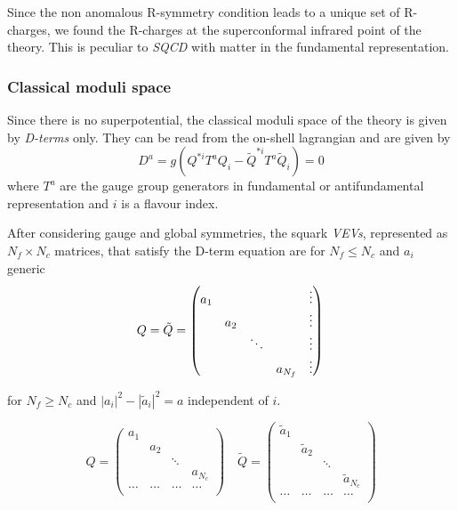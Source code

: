 Since the non anomalous R-symmetry condition leads to a unique set of R-charges, we found the R-charges at the superconformal infrared point of the theory.
This is peculiar to \emph{SQCD} with matter in the fundamental representation. 


\subsubsection{Classical moduli space}
Since there is no superpotential, the classical moduli space of the theory is given by \emph{D-terms} only. 
They can be read from the on-shell lagrangian and are given by
\begin{equation}
 D^a = g \left( Q^{*i} T^a Q_i - \tilde{Q}^{* i} T^a \tilde{Q}_i \right) = 0
\end{equation}
where $T^a$ are the gauge group generators in fundamental or antifundamental representation and $i$ is a flavour index.

After considering gauge and global symmetries, the squark \emph{VEVs}, represented as $N_f \times N_c$ matrices, that satisfy the D-term equation are for  $N_f \le N_c$ and $a_i$ generic
\begin{equation}
Q = \tilde{Q} = 
\begin{pmatrix}
 a_1 & 		&	 &	 & \vdots \\
	 & a_2  & 	 & 	 & \vdots \\  	
 	 & 		&	\ddots &	 &\vdots  \\
	 &  & 	 & 	a_{N_f}  & \vdots
\end{pmatrix} 
 \\
\end{equation}

for $N_f \geq N_c$ and $ | a_i|^2 - | \tilde{a}_i |^2 = a $ independent of $i$.

\begin{equation}
Q  = 
\begin{pmatrix} 
	 a_1 & 		&	 &	  \\
	 & a_2  & 	 & 	 \\  	
 	 & 		&	\ddots &	   \\
	 &  & 	 & 	a_{N_c}  \\
	 \dots & \dots & \dots & \dots\\ 
\end{pmatrix} 
\quad
\tilde{Q} = 
\begin{pmatrix}
 \tilde{a}_1 & 		&	 &	  \\
	 & \tilde{a}_2  & 	 & 	 \\  	
 	 & 		&	\ddots &	   \\
	 &  & 	 & 	\tilde{a}_{N_c}  \\
	 \dots & \dots & \dots & \dots\\ 
\end{pmatrix} 
\end{equation}


